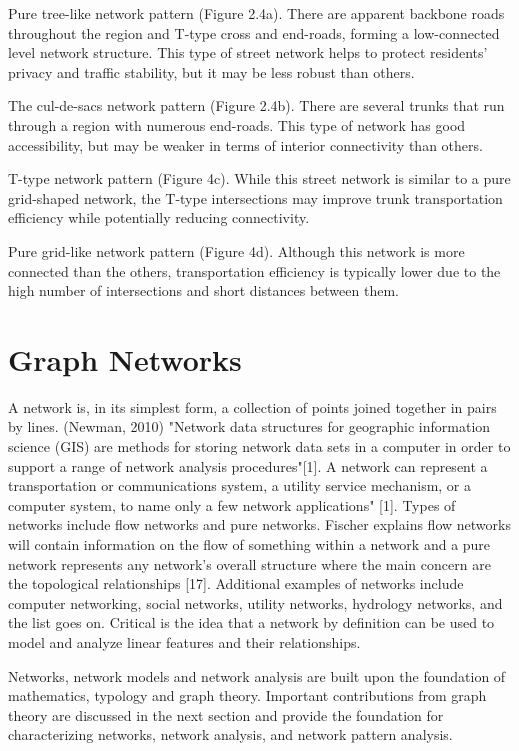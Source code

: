 Pure tree-like network pattern (Figure 2.4a). There are apparent backbone roads throughout the region and T-type cross and end-roads, forming a low-connected level network structure. This type of street network helps to protect residents' privacy and traffic stability, but it may be less robust than others.

The cul-de-sacs network pattern (Figure 2.4b). There are several trunks that run through a region with numerous end-roads. This type of network has good accessibility, but may be weaker in terms of interior connectivity than others.

T-type network pattern (Figure 4c). While this street network is similar to a pure grid-shaped network, the T-type intersections may improve trunk transportation efficiency while potentially reducing connectivity.

Pure grid-like network pattern (Figure 4d). Although this network is more connected than the others, transportation efficiency is typically lower due to the high number of intersections and short distances between them.

\section{Graph Networks}
A network is, in its simplest form, a collection of points joined together in pairs by lines. (Newman, 2010) "Network data structures for geographic information science (GIS) are methods for storing network data sets in a computer in order to support a range of network analysis procedures"[1]. A network can represent a transportation or communications system, a utility service mechanism, or a computer system, to name only a few network applications" [1]. Types of networks include flow networks and pure networks. Fischer explains flow networks will contain information on the flow of something within a network and a pure network represents any network's overall structure where the main concern are the topological relationships [17]. Additional examples of networks include computer networking, social networks, utility networks, hydrology networks, and the list goes on. Critical is the idea that a network by definition can be used to model and analyze linear features and their relationships. 

Networks, network models and network analysis are built upon the foundation of mathematics, typology and graph theory. Important contributions from graph theory are discussed in the next section and provide the foundation for characterizing networks, network analysis, and network pattern analysis.

